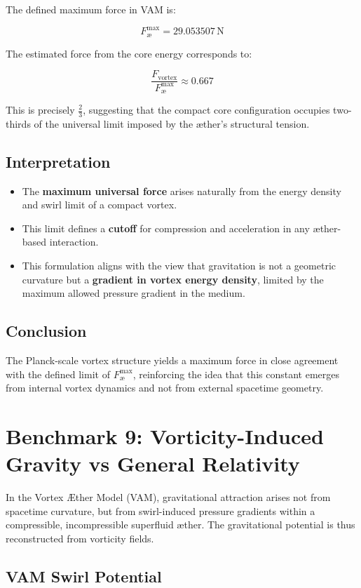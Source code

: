 \documentclass[preprint]{revtex4-2}
\begin{document}
The defined maximum force in VAM is:

\[
F_\text{\ae}^\text{max} = 29.053507 \, \text{N}
\]

The estimated force from the core energy corresponds to:

\[
\frac{F_{\text{vortex}}}{F_\text{\ae}^\text{max}} \approx 0.667
\]

This is precisely \(\frac{2}{3}\), suggesting that the compact core configuration occupies two-thirds of the universal limit imposed by the æther's structural tension.

\subsection{Interpretation}

\begin{itemize}
    \item The \textbf{maximum universal force} arises naturally from the energy density and swirl limit of a compact vortex.
    \item This limit defines a \textbf{cutoff} for compression and acceleration in any æther-based interaction.
    \item This formulation aligns with the view that gravitation is not a geometric curvature but a \textbf{gradient in vortex energy density}, limited by the maximum allowed pressure gradient in the medium.
\end{itemize}

\subsection{Conclusion}

The Planck-scale vortex structure yields a maximum force in close agreement with the defined limit of \( F_\text{\ae}^\text{max} \), reinforcing the idea that this constant emerges from internal vortex dynamics and not from external spacetime geometry.
\section{Benchmark 9: Vorticity-Induced Gravity vs General Relativity}

In the Vortex Æther Model (VAM), gravitational attraction arises not from spacetime curvature, but from swirl-induced pressure gradients within a compressible, incompressible superfluid æther. The gravitational potential is thus reconstructed from vorticity fields.

\subsection{VAM Swirl Potential}
\end{document}
